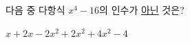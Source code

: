 다음 중 다항식 $x^4-16$의 인수가 \underline{아닌} 것은?
\begin{choices32}{$x+2$}{$x-2$}{$x^2+2$}{$x^2+4$}{$x^2-4$}\end{choices32}
